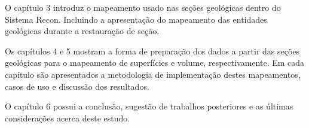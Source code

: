 O capítulo 3 introduz o mapeamento usado nas seções geológicas dentro do Sistema Recon. Incluindo a apresentação do mapeamento das entidades geológicas durante a restauração de seção.

Os capítulos 4 e 5 mostram a forma de preparação dos dados a partir das seções geológicas para o mapeamento de superfícies e volume, respectivamente. Em cada capítulo são apresentados a metodologia de implementação destes mapeamentos, casos de uso e discussão dos resultados.

O capítulo 6 possui a conclusão, sugestão de trabalhos posteriores e as últimas considerações acerca deste estudo.